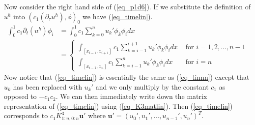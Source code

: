 \documentclass[11pt,fleqn]{article}
\theoremstyle{defstyle}
\begin{document}
Now consider the right hand side of (\ref{eq_p1d6}). If we substitute the definition of $u^h$ into  $(c_1(\partial_{\tau}u^h),\phi)_0$ we have (\ref{eq_timelin}).
\begin{equation}
\begin{aligned}
\int_0^1 c_1\partial_t (u^h) \phi_i &= \int_0^1 c_1\sum_{k=0}^{n} u_k\prime \phi_k \phi_i dx \\
&= \begin{cases}
\int_{[x_{i-1},x_{i+1}]}c_1\sum_{k=i-1}^{i+1} u_k\prime \phi_k\phi_idx &\text{ for } i=1,2,..., n-1 \\
\int_{[x_{i-1},x_{n}]}c_1\sum_{k=i-1}^{n} u_k\prime \phi_k \phi_idx &\text{ for } i=n
\end{cases}
\end{aligned}
\label{eq_timelin}
\end{equation}
Now notice that (\ref{eq_timelin}) is essentially the same as (\ref{eq_linnn}) except that $u_k$ has been replaced with $u_k\prime$ and we only multiply by the constant $c_1$ as opposed to $-c_1c_2$. We can then immediately write down the matrix representation of (\ref{eq_timelin}) using (\ref{eq_K3matlin}). Then (\ref{eq_timelin}) corresponds to $c_1K^3_{1:n, 0:n}\mathbf{u}\prime$  where $\mathbf{u}\prime = \left(u_0\prime,u_1\prime,...,u_{n-1}\prime,u_n\prime \right)^T$.
\end{document}
